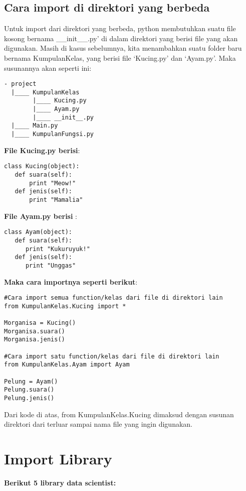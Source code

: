 \subsection{Cara import di direktori yang berbeda}
Untuk import dari direktori yang berbeda, python membutuhkan suatu file kosong bernama \_\_init\_\_.py’ di dalam direktori yang berisi file yang akan digunakan. Masih di kasus sebelumnya, kita menambahkan suatu folder baru bernama KumpulanKelas, yang berisi file ‘Kucing.py’ dan ‘Ayam.py’. Maka susunannya akan seperti ini:
\begin{lstlisting}
- project
  |____ KumpulanKelas
        |____ Kucing.py
        |____ Ayam.py
        |____ __init__.py
  |____ Main.py
  |____ KumpulanFungsi.py
\end{lstlisting}
\par \textbf{File Kucing.py berisi}:
\begin{lstlisting}
class Kucing(object):
   def suara(self):
       print "Meow!"
   def jenis(self):
       print "Mamalia"
\end{lstlisting}
\par \textbf{File Ayam.py berisi }:
\begin{lstlisting}
class Ayam(object):
   def suara(self):
      print "Kukuruyuk!"
   def jenis(self):
      print "Unggas"
\end{lstlisting}
\par\textbf{Maka cara importnya seperti berikut}:
\begin{lstlisting}
#Cara import semua function/kelas dari file di direktori lain
from KumpulanKelas.Kucing import *

Morganisa = Kucing()
Morganisa.suara()
Morganisa.jenis()

#Cara import satu function/kelas dari file di direktori lain
from KumpulanKelas.Ayam import Ayam

Pelung = Ayam()
Pelung.suara()
Pelung.jenis()
\end{lstlisting}
Dari kode di atas, from KumpulanKelas.Kucing dimaksud dengan susunan direktori dari terluar sampai nama file yang ingin digunakan.
\newpage \section{Import Library}
\textbf{Berikut 5 library data scientist:}
